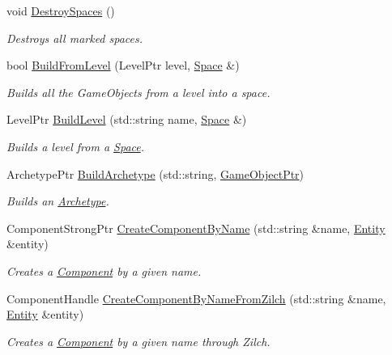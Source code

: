 \begin{DoxyCompactItemize}
\item 
void \hyperlink{classDCEngine_1_1Systems_1_1Factory_a7856a2fa567887c4721c81c9cbb9d54e}{Destroy\-Spaces} ()
\begin{DoxyCompactList}\small\item\em Destroys all marked spaces. \end{DoxyCompactList}\item 
bool \hyperlink{classDCEngine_1_1Systems_1_1Factory_ac39685b8d9e7aeb3d560f59026cbdada}{Build\-From\-Level} (Level\-Ptr level, \hyperlink{classDCEngine_1_1Space}{Space} \&)
\begin{DoxyCompactList}\small\item\em Builds all the Game\-Objects from a level into a space. \end{DoxyCompactList}\item 
Level\-Ptr \hyperlink{classDCEngine_1_1Systems_1_1Factory_a62cdcbce294027e60c0dc88d6aef3a7a}{Build\-Level} (std\-::string name, \hyperlink{classDCEngine_1_1Space}{Space} \&)
\begin{DoxyCompactList}\small\item\em Builds a level from a \hyperlink{classDCEngine_1_1Space}{Space}. \end{DoxyCompactList}\item 
Archetype\-Ptr \hyperlink{classDCEngine_1_1Systems_1_1Factory_a2fc0899e367302961da9c5af68dd583d}{Build\-Archetype} (std\-::string, \hyperlink{classDCEngine_1_1GameObject}{Game\-Object\-Ptr})
\begin{DoxyCompactList}\small\item\em Builds an \hyperlink{classDCEngine_1_1Archetype}{Archetype}. \end{DoxyCompactList}\item 
Component\-Strong\-Ptr \hyperlink{classDCEngine_1_1Systems_1_1Factory_a53b017cb3c1800fff673fb190e852161}{Create\-Component\-By\-Name} (std\-::string \&name, \hyperlink{classDCEngine_1_1Entity}{Entity} \&entity)
\begin{DoxyCompactList}\small\item\em Creates a \hyperlink{classDCEngine_1_1Component}{Component} by a given name. \end{DoxyCompactList}\item 
Component\-Handle \hyperlink{classDCEngine_1_1Systems_1_1Factory_a2658241174aad502a5d1d867c79f97f2}{Create\-Component\-By\-Name\-From\-Zilch} (std\-::string \&name, \hyperlink{classDCEngine_1_1Entity}{Entity} \&entity)
\begin{DoxyCompactList}\small\item\em Creates a \hyperlink{classDCEngine_1_1Component}{Component} by a given name through Zilch. \end{DoxyCompactList}\item 

\end{DoxyCompactItemize}
